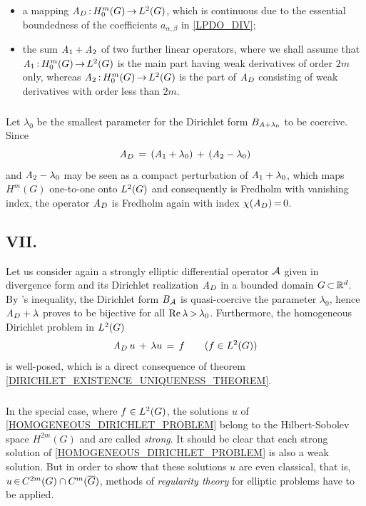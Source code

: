\documentclass[11pt,twoside]{article}
\def\G{G}
\begin{document}
\begin{itemize}[leftmargin=9mm]
\item[(F-1)]
a mapping $\linA_D \: \HN{m}{\G} \xto \Lh$,
which is continuous due to the essential boundedness
of the coefficients $a_{\alpha,\beta}$ in \eqref{LPDO_DIV};

\item[(F-2)]
the sum $\mathit{A}_1 + \mathit{A}_2$ of two further linear operators,
where we shall assume that
$\linA_1 \: \HN{m}{\G} \xto \Lh$ is the main part 
having weak derivatives of order $2m$ only,
whereas $\linA_2 \: \HN{m}{\G} \xto \Lh$ is the part of $\mathit{A}_D$
consisting of weak derivatives with order less than $2m$.
\end{itemize}

\subparagraph{}
Let $\lambda_0$ be the smallest parameter
for the Dirichlet form $B_{\mathit{A}+\lambda_0}$ to be coercive.
Since
\[
\mathit{A}_D \,=\, (\mathit{A}_1 + \lambda_0) \,+\, (\mathit{A}_2 - \lambda_0)
\]
and $\mathit{A}_2- \lambda_0$ may be seen as a compact perturbation
of $\mathit{A}_1+\lambda_0$,
which maps $H^m(\G)$ one-to-one onto $\Lh$ and consequently is Fredholm 
with vanishing index,
the operator $\mathit{A}_D$ is Fredholm again with index $\chi(\mathit{A}_D) {\,=\,} 0$.

\subsection*{VII. {\TITLEG}}
Let us consider again a strongly elliptic differential operator ${\mathcal{A}}$
given in divergence form and its Dirichlet realization $\mathit{A}_D$
in a bounded domain $\G \xsubset \Rd$.
By {\GARDING}'s inequality,
the Dirichlet form $B_{{\mathcal{A}}}$ is quasi-coercive
{\wrt} the parameter $\lambda_0$,
hence $\mathit{A}_D + \lambda$ proves to be bijective
for all $\operatorname{Re} \lambda {\,>\,} \lambda_0$.
Furthermore,
the homogeneous Dirichlet problem in $\Lh$
\begin{equation}\label{HOMOGENEOUS_DIRICHLET_PROBLEM}
\linA_D \, u  \+ \lambda u \= f \quad \quad (f \in \Lh)
\end{equation}
is well-posed,
which is a direct consequence of
theorem \ref{DIRICHLET_EXISTENCE_UNIQUENESS_THEOREM}.

\subparagraph{}
In the special case,
where $f \in \Lh$,
the solutions $u$ of \eqref{HOMOGENEOUS_DIRICHLET_PROBLEM}
belong to the Hilbert-Sobolev space $H^{2m}(\G)$ and are called \textit{strong}.
It should be clear that 
each strong solution of \eqref{HOMOGENEOUS_DIRICHLET_PROBLEM}
is also a weak solution.
But in order to show that these solutions $u$ are even classical,
that is,
$u \xeof C^{2m}(\G) \cap C^m(\clG)$,
methods of \textit{regularity theory} for elliptic problems have to be applied.
\end{document}
